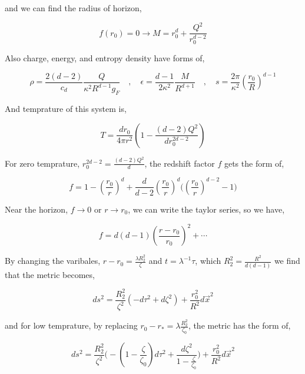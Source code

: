 and we can find the radius of horizon,

\begin{equation} \label{eq:radiusHorizonChargedBlackHole}
    f(r_0) = 0 \rightarrow  M = r^d_0 + \frac{Q^2}{r^{d-2}_0}
\end{equation}

Also charge, energy, and entropy density have forms of,

\begin{equation}
    \rho = \frac{2(d-2)}{c_d}\frac{Q}{\kappa^2 R^{d-1}g_F} \quad , \quad \epsilon = \frac{d-1}{2\kappa^2}\frac{M}{R^{d+1}} \quad , \quad s = \frac{2\pi}{\kappa^2}(\frac{r_0}{R})^{d-1}
\end{equation} 

And temprature of this system is,

\begin{equation}
    T = \frac{dr_0}{4\pi r^2}(1-\frac{(d-2)Q^2}{dr_0^{2d-2}})
\end{equation}

For zero temprature, $r_0^{2d-2} = \frac{(d-2)Q^2}{d}$, the redshift factor $f$ gets the form of,

\begin{equation}
    f = 1- (\frac{r_0}{r})^d + \frac{d}{d-2}(\frac{r_0}{r})^d\bigg((\frac{r_0}{r})^{d-2} - 1\bigg)
\end{equation}

Near the horizon, $f \rightarrow 0$ or $r \rightarrow r_0$, we can write the taylor series, so we have,

\begin{equation}
    f = d(d-1)(\frac{r-r_0}{r_0})^2 + \cdots
\end{equation}

By changing the varibales, $r-r_0 = \frac{\lambda R^2_2}{\zeta}$ and $t = \lambda^{-1}\tau$, which $R^2_2 = \frac{R^2}{d(d-1)}$ we find that the metric becomes,

\begin{equation}
    ds^2 = \frac{R^2_2}{\zeta^2}(-d\tau^2 + d\zeta^2) + \frac{r^2_0}{R^2}d\vec{x}^2
\end{equation}

and for low temprature, by replacing $r_0 - r_* = \lambda \frac{R^2_2}{\zeta_0}$, the metric has the form of,

\begin{equation}
    ds^2 = \frac{R^2_2}{\zeta^2}\bigg(-(1-\frac{\zeta}{\zeta_0})d\tau^2 + \frac{d\zeta^2}{1-\frac{\zeta}{\zeta_0}} \bigg) + \frac{r^2_0}{R^2}d\vec{x}^2
\end{equation}

